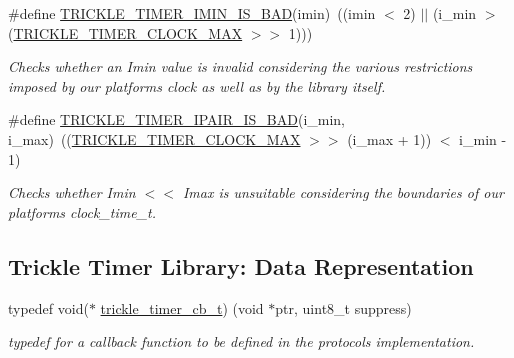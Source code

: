 \begin{DoxyCompactItemize}
\#define \hyperlink{group__trickle-timer_ga48f0bd27341eba9602cb971642221700}{T\+R\+I\+C\+K\+L\+E\+\_\+\+T\+I\+M\+E\+R\+\_\+\+I\+M\+I\+N\+\_\+\+I\+S\+\_\+\+B\+A\+D}(imin)~((imin $<$ 2) $\vert$$\vert$ (i\+\_\+min $>$ (\hyperlink{group__trickle-timer_ga8c327f7f935dcc95d89fcbbc664fcdcf}{T\+R\+I\+C\+K\+L\+E\+\_\+\+T\+I\+M\+E\+R\+\_\+\+C\+L\+O\+C\+K\+\_\+\+M\+A\+X} $>$$>$ 1)))
\begin{DoxyCompactList}\small\item\em Checks whether an Imin value is invalid considering the various restrictions imposed by our platform\textquotesingle{}s clock as well as by the library itself. \end{DoxyCompactList}\item 
\#define \hyperlink{group__trickle-timer_ga82b7d1b4b6fb7d11da496229782a5ba7}{T\+R\+I\+C\+K\+L\+E\+\_\+\+T\+I\+M\+E\+R\+\_\+\+I\+P\+A\+I\+R\+\_\+\+I\+S\+\_\+\+B\+A\+D}(i\+\_\+min,  i\+\_\+max)~((\hyperlink{group__trickle-timer_ga8c327f7f935dcc95d89fcbbc664fcdcf}{T\+R\+I\+C\+K\+L\+E\+\_\+\+T\+I\+M\+E\+R\+\_\+\+C\+L\+O\+C\+K\+\_\+\+M\+A\+X} $>$$>$ (i\+\_\+max + 1)) $<$ i\+\_\+min -\/ 1)
\begin{DoxyCompactList}\small\item\em Checks whether Imin $<$$<$ Imax is unsuitable considering the boundaries of our platform\textquotesingle{}s clock\+\_\+time\+\_\+t. \end{DoxyCompactList}\end{DoxyCompactItemize}
\subsection*{Trickle Timer Library\+: Data Representation}
\begin{DoxyCompactItemize}
\item 
typedef void($\ast$ \hyperlink{group__trickle-timer_ga243193848d28e6373682b8bd2e25850a}{trickle\+\_\+timer\+\_\+cb\+\_\+t}) (void $\ast$ptr, uint8\+\_\+t suppress)
\begin{DoxyCompactList}\small\item\em typedef for a callback function to be defined in the protocol\textquotesingle{}s implementation. \end{DoxyCompactList}\end{DoxyCompactItemize}
